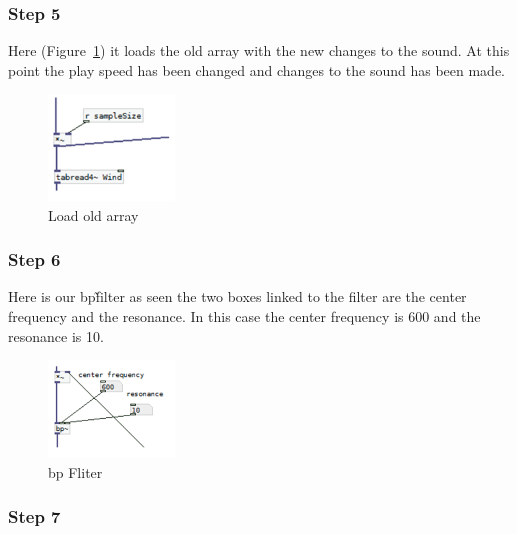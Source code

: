 

\subsubsection*{Step 5} %
\label{ssub:step_5}

Here (Figure~\ref{fig:implementation7}) it loads the old array with the new changes to the sound. 
At this point the play speed has been changed and changes to the sound has been made.

\begin{figure}[!htbp]
    \centering
    \includegraphics[width=0.3\textwidth]{images/Implementation7.png}
    \caption{Load old array}
    \label{fig:implementation7}
\end{figure}



\subsubsection*{Step 6} %
\label{ssub:step_6}

Here is our bp\~ filter as seen the two boxes linked to the filter are the center frequency and the resonance. 
In this case the center frequency is 600 and the resonance is 10.

\begin{figure}[!htbp]
    \centering
    \includegraphics[width=0.3\textwidth]{images/Implementation8.png}
    \caption{bp Fliter}
    \label{fig:implementation8}
\end{figure}



\subsubsection*{Step 7} %
\label{ssub:step_7}

